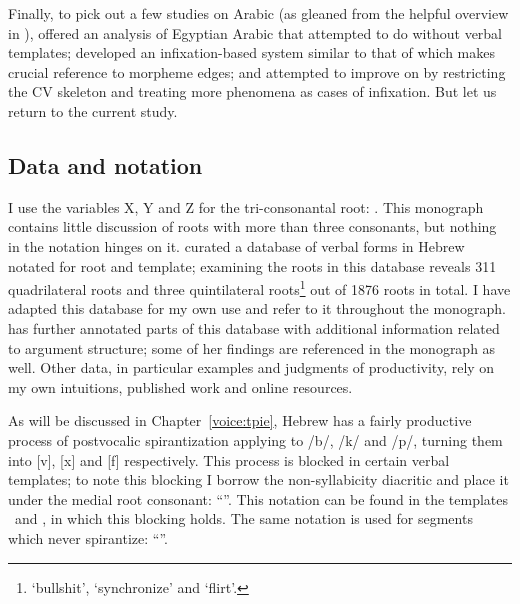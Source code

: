 \begin{exe}
\begin{xlist}
\begin{exe}
\begin{exe}
\begin{exe}
\begin{exe}
\begin{xlist}
\begin{exe}
\begin{xlist}
\begin{xlist}
\begin{xlist}
\begin{exe}
\begin{xlist}
\begin{exe}
\begin{exe}
Finally, to pick out a few studies on Arabic (as gleaned from the helpful overview in \citealt{ussishkin00phd}), \cite{darden92} offered an analysis of Egyptian Arabic that attempted to do without verbal templates; \cite{mcomber95} developed an infixation-based system similar to that of \cite{jjmcc81} which makes crucial reference to morpheme edges; and \cite{ratcliffe97,ratcliffe98} attempted to improve on \cite{jjmccprince90} by restricting the CV skeleton and treating more phenomena as cases of infixation. But let us return to the current study.

	\subsection{Data and notation} \label{sec:data:notation}
I use the variables X, Y and Z for the tri-consonantal root: . This monograph contains little discussion of roots with more than three consonants, but nothing in the notation hinges on it. \cite{ehrenfeld12} curated a database of verbal forms in Hebrew notated for root and template; examining the roots in this database reveals 311 quadrilateral roots and three quintilateral roots\footnote{ `bullshit',  `synchronize' and  `flirt'.} out of 1876 roots in total. I have adapted this database for my own use and refer to it throughout the monograph. \cite{ahdout19phd} has further annotated parts of this database with additional information related to argument structure; some of her findings are referenced in the monograph as well. Other data, in particular examples and judgments of productivity, rely on my own intuitions, published work and online resources.

As will be discussed in Chapter~\ref{voice:tpie}, Hebrew has a fairly productive process of postvocalic spirantization applying to /b/, /k/ and /p/, turning them into [v], [x] and [f] respectively. This process is blocked in certain verbal templates; to note this blocking I borrow the non-syllabicity diacritic and place it under the medial root consonant: ``''. This notation can be found in the templates \tpie~and \thit, in which this blocking holds. The same notation is used for segments which never spirantize: ``''.


\end{exe}
\end{exe}
\end{xlist}
\end{exe}
\end{xlist}
\end{xlist}
\end{xlist}
\end{exe}
\end{xlist}
\end{exe}
\end{exe}
\end{exe}
\end{exe}
\end{xlist}
\end{exe}
